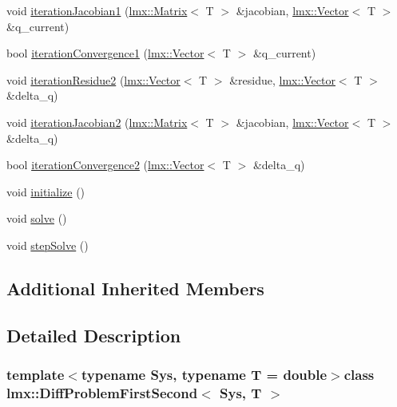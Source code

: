 \begin{DoxyCompactItemize}
\item 
void \hyperlink{classlmx_1_1DiffProblemFirstSecond_a8f5115e56061245b6a198dbd8f642f3f}{iteration\-Jacobian1} (\hyperlink{classlmx_1_1Matrix}{lmx\-::\-Matrix}$<$ T $>$ \&jacobian, \hyperlink{classlmx_1_1Vector}{lmx\-::\-Vector}$<$ T $>$ \&q\-\_\-current)
\item 
bool \hyperlink{classlmx_1_1DiffProblemFirstSecond_a3e0d52e42e05252fcaee47e3a52cb097}{iteration\-Convergence1} (\hyperlink{classlmx_1_1Vector}{lmx\-::\-Vector}$<$ T $>$ \&q\-\_\-current)
\item 
void \hyperlink{classlmx_1_1DiffProblemFirstSecond_a01b4a3b0d4b1630ccab1a47cf8f9468d}{iteration\-Residue2} (\hyperlink{classlmx_1_1Vector}{lmx\-::\-Vector}$<$ T $>$ \&residue, \hyperlink{classlmx_1_1Vector}{lmx\-::\-Vector}$<$ T $>$ \&delta\-\_\-q)
\item 
void \hyperlink{classlmx_1_1DiffProblemFirstSecond_abe64149d07435a2091782942761d6da0}{iteration\-Jacobian2} (\hyperlink{classlmx_1_1Matrix}{lmx\-::\-Matrix}$<$ T $>$ \&jacobian, \hyperlink{classlmx_1_1Vector}{lmx\-::\-Vector}$<$ T $>$ \&delta\-\_\-q)
\item 
bool \hyperlink{classlmx_1_1DiffProblemFirstSecond_a5f890ed31d02b4f81bd624c8dd856929}{iteration\-Convergence2} (\hyperlink{classlmx_1_1Vector}{lmx\-::\-Vector}$<$ T $>$ \&delta\-\_\-q)
\item 
void \hyperlink{classlmx_1_1DiffProblemFirstSecond_a13e52b8a33f4af805743a29e91ac578a}{initialize} ()
\item 
void \hyperlink{classlmx_1_1DiffProblemFirstSecond_a0c15ac40c99ebe79b546bf0779599301}{solve} ()
\item 
void \hyperlink{classlmx_1_1DiffProblemFirstSecond_ad53dc78b8c04c0a6cab59e35836d8e3e}{step\-Solve} ()
\end{DoxyCompactItemize}
\subsection*{Additional Inherited Members}


\subsection{Detailed Description}
\subsubsection*{template$<$typename Sys, typename T = double$>$class lmx\-::\-Diff\-Problem\-First\-Second$<$ Sys, T $>$}

